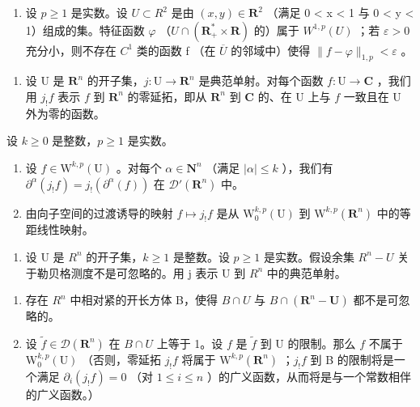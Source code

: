 \begin{enumerate}
\def\labelenumi{\alph{enumi})}
\setcounter{enumi}{1}
\tightlist
\item
  设 \(p \geqslant 1\) 是实数。设 \(U \subset R^{2}\) 是由 \((x, y) \in \mathbf{R}^{2}\) （满足 0 \textless{} \textbar x\textbar{} \textless{} 1 与 0 \textless{} y \textless{} 1）组成的集。特征函数 \(\varphi\) （\(U \cap (\mathbf{R}_{+}^{*} \times \mathbf{R})\) 的）属于 \(W^{1,p}(U)\) ；若 \(\varepsilon > 0\) 充分小，则不存在 \(C^{1}\) 类的函数 f （在 \(\overline{U}\) 的邻域中）使得 \(\|f - \varphi\|_{1,p} < \varepsilon\) 。
\end{enumerate}

\begin{enumerate}
\def\labelenumi{\arabic{enumi})}
\setcounter{enumi}{12}
\tightlist
\item
  设 U 是 \(\mathbf{R}^n\) 的开子集，\(j\colon \mathrm{U}\to \mathbf{R}^n\) 是典范单射。对每个函数 \(f\colon \mathrm{U}\to \mathbf{C}\) ，我们用 \(j_{!}f\) 表示 \(f\) 到 \(\mathbf{R}^n\) 的零延拓，即从 \(\mathbf{R}^n\) 到 \(\mathbf{C}\) 的、在 U 上与 \(f\) 一致且在 U 外为零的函数。
\end{enumerate}

设 \(k \geqslant 0\) 是整数，\(p \geqslant 1\) 是实数。

\begin{enumerate}
\def\labelenumi{\alph{enumi})}
\item
  设 \(f \in \mathrm{W}^{k,p}(\mathrm{U})\) 。对每个 \(\alpha \in \mathbf{N}^n\) （满足 \(|\alpha| \leqslant k\) ），我们有 \(\partial^\alpha(j_{!}f) = j_{!}(\partial^\alpha(f))\) 在 \(\mathcal{D}'(\mathbf{R}^n)\) 中。
\item
  由向子空间的过渡诱导的映射 \(f \mapsto j_{!}f\) 是从 \(\mathrm{W}_{0}^{k,p}(\mathrm{U})\) 到 \(\mathrm{W}^{k,p}(\mathbf{R}^{n})\) 中的等距线性映射。
\end{enumerate}

\begin{enumerate}
\def\labelenumi{\arabic{enumi})}
\setcounter{enumi}{13}
\tightlist
\item
  设 U 是 \(R^{n}\) 的开子集，\(k \geqslant 1\) 是整数。设 \(p \geqslant 1\) 是实数。假设余集 \(R^{n} - U\) 关于勒贝格测度不是可忽略的。用 j 表示 U 到 \(R^{n}\) 中的典范单射。
\end{enumerate}

\begin{enumerate}
\def\labelenumi{\alph{enumi})}
\item
  存在 \(R^{n}\) 中相对紧的开长方体 B，使得 \(B \cap U\) 与 \(B \cap (\mathbf{R}^{n} - \mathbf{U})\) 都不是可忽略的。
\item
  设 \(\widetilde{f} \in \mathcal{D}(\mathbf{R}^n)\) 在 \(B \cap U\) 上等于 1。设 \(f\) 是 \(\widetilde{f}\) 到 U 的限制。那么 \(f\) 不属于 \(\mathrm{W}_0^{k,p}(\mathrm{U})\) （否则，零延拓 \(j_{!}f\) 将属于 \(\mathrm{W}^{k,p}(\mathbf{R}^n)\) ；\(j_{!}f\) 到 B 的限制将是一个满足 \(\partial_i(j_{!}f) = 0\) （对 \(1 \leqslant i \leqslant n\) ）的广义函数，从而将是与一个常数相伴的广义函数。）
\end{enumerate}

